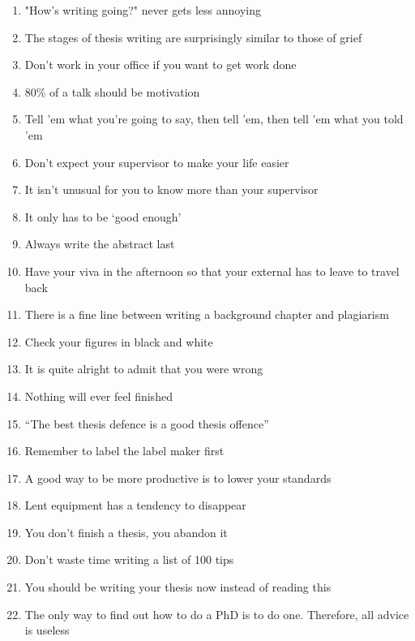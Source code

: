 \begin{enumerate}
	\item "How's writing going?" never gets less annoying
	\item The stages of thesis writing are surprisingly similar to those of grief
	\item Don't work in your office if you want to get work done 
	\item 80\% of a talk should be motivation
	\item Tell 'em what you're going to say, then tell 'em, then tell 'em what you told 'em
	\item Don't expect your supervisor to make your life easier
	\item It isn't unusual for you to know more than your supervisor
	\item It only has to be `good enough'
	\item Always write the abstract last
	\item Have your viva in the afternoon so that your external has to leave to travel back
	\item There is a fine line between writing a background chapter and plagiarism
	\item Check your figures in black and white
	\item It is quite alright to admit that you were wrong
	\item Nothing will ever feel finished
	\item ``The best thesis defence is a good thesis offence'' \cite{xkcd1403}
	\item Remember to label the label maker first
	\item A good way to be more productive is to lower your standards
	\item Lent equipment has a tendency to disappear
	\item You don't finish a thesis, you abandon it 
	\item Don't waste time writing a list of 100 tips
	\item You should be writing your thesis now instead of reading this
	\item The only way to find out how to do a PhD is to do one. Therefore, all advice is useless\cite{richardbutterworth}
\end{enumerate}